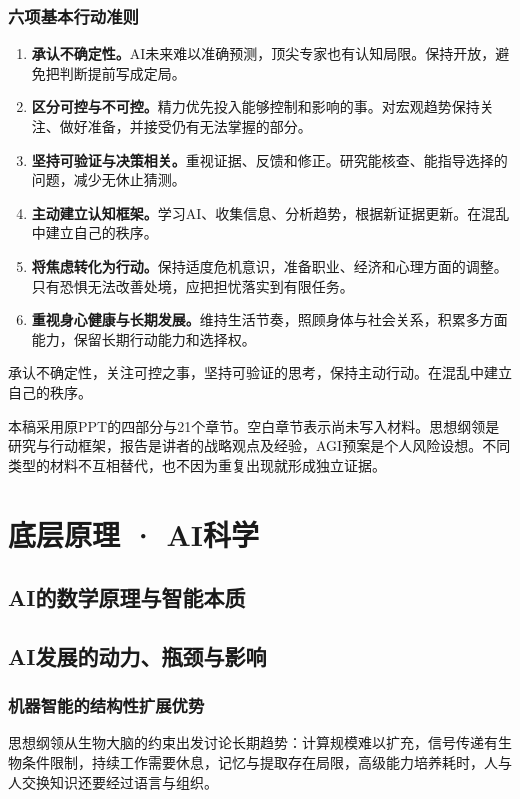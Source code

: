 \documentclass[UTF8,zihao=-4,fontset=fandol,oneside,openany]{ctexbook}
\newenvironment{keybox}[1]{\begin{tcolorbox}[title={#1}]}{\end{tcolorbox}}
\begin{document}
\subsection*{六项基本行动准则}
\begin{enumerate}
\item \textbf{承认不确定性。}AI未来难以准确预测，顶尖专家也有认知局限。保持开放，避免把判断提前写成定局。
\item \textbf{区分可控与不可控。}精力优先投入能够控制和影响的事。对宏观趋势保持关注、做好准备，并接受仍有无法掌握的部分。
\item \textbf{坚持可验证与决策相关。}重视证据、反馈和修正。研究能核查、能指导选择的问题，减少无休止猜测。
\item \textbf{主动建立认知框架。}学习AI、收集信息、分析趋势，根据新证据更新。在混乱中建立自己的秩序。
\item \textbf{将焦虑转化为行动。}保持适度危机意识，准备职业、经济和心理方面的调整。只有恐惧无法改善处境，应把担忧落实到有限任务。
\item \textbf{重视身心健康与长期发展。}维持生活节奏，照顾身体与社会关系，积累多方面能力，保留长期行动能力和选择权。
\end{enumerate}

\begin{keybox}{核心原则}
承认不确定性，关注可控之事，坚持可验证的思考，保持主动行动。在混乱中建立自己的秩序。
\end{keybox}

本稿采用原PPT的四部分与21个章节。空白章节表示尚未写入材料。思想纲领是研究与行动框架，报告是讲者的战略观点及经验，AGI预案是个人风险设想。不同类型的材料不互相替代，也不因为重复出现就形成独立证据。
\tableofcontents
\mainmatter
\chapter{底层原理 · AI科学}
\section{AI的数学原理与智能本质}

\section{AI发展的动力、瓶颈与影响}
\subsection*{机器智能的结构性扩展优势}
思想纲领从生物大脑的约束出发讨论长期趋势：计算规模难以扩充，信号传递有生物条件限制，持续工作需要休息，记忆与提取存在局限，高级能力培养耗时，人与人交换知识还要经过语言与组织\cite{principles}。
\end{document}

